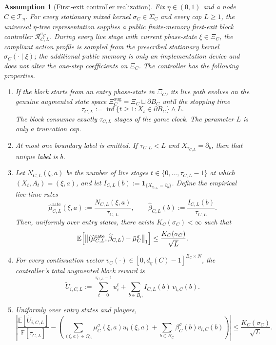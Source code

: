\documentclass[12pt]{article}
\newtheorem{assumption}[theorem]{Assumption}
\theoremstyle{definition}
\newcommand{\E}{\mathbb{E}}
\newcommand{\1}{\mathbf{1}}
\newcommand{\cT}{\mathcal{T}}
\begin{document}
\begin{assumption}[First-exit controller realization]
\label{ass:controller-input}
Fix $\eta\in(0,1)$ and a node $C\in\cT_\eta$. For every stationary mixed kernel
$\sigma_C\in\Sigma_C$ and every cap $L\ge 1$, the universal
$\eta$-tree representation supplies a public finite-memory first-exit block
controller $\mathcal R_{C,L}^{\sigma_C}$. During every live stage with current
phase-state $\xi\in\Xi_C$, the compliant action profile is sampled from the
prescribed stationary kernel $\sigma_C(\cdot\mid\xi)$; the additional public
memory is only an implementation device and does not alter the one-step
coefficients on $\Xi_C$. The controller has the following properties.
\begin{enumerate}[label=\textnormal{(R\arabic*)},leftmargin=2.8em]
\item If the block starts from an entry phase-state in $\Xi_C$, its live path
evolves on the genuine augmented state space
$\Xi_C^{\mathrm{aug}}=\Xi_C\sqcup\partial B_C$ until the stopping time
\[
\tau_{C,L}
:=
\inf\{t\ge 1:X_t\in\partial B_C\}\wedge L.
\]
The block consumes exactly $\tau_{C,L}$ stages of the game clock. The parameter
$L$ is only a truncation cap.
\item At most one boundary label is emitted. If $\tau_{C,L}<L$ and
$X_{\tau_{C,L}}=\partial_b$, then that unique label is $b$.
\item Let $N_{C,L}(\xi,a)$ be the number of live stages
$t\in\{0,\dots,\tau_{C,L}-1\}$ at which $(X_t,A_t)=(\xi,a)$, and let
$I_{C,L}(b):=\1_{\{X_{\tau_{C,L}}=\partial_b\}}$. Define the empirical live-time
rates
\[
\widehat\mu_{C,L}^{\mathrm{rate}}(\xi,a):=\frac{N_{C,L}(\xi,a)}{\tau_{C,L}},
\qquad
\widehat\beta_{C,L}(b):=\frac{I_{C,L}(b)}{\tau_{C,L}}.
\]
Then, uniformly over entry states, there exists $K_C(\sigma_C)<\infty$ such that
\begin{equation}
\label{eq:controller-input-occ}
\E\Bigl[
\bigl\|(\widehat\mu_{C,L}^{\mathrm{rate}},\widehat\beta_{C,L})
-
\bar\mu_C^\sigma
\bigr\|_1
\Bigr]
\le \frac{K_C(\sigma_C)}{\sqrt L}.
\end{equation}
\item For every continuation vector
$v_C(\cdot)\in[0,d_\eta(C)-1]^{B_C\times N}$, the controller's total augmented
block reward is
\[
\widetilde U_{i,C,L}
:=
\sum_{t=0}^{\tau_{C,L}-1} u_i^t
+
\sum_{b\in B_C}I_{C,L}(b)\,v_{i,C}(b).
\]
\item Uniformly over entry states and players,
\begin{equation}
\label{eq:controller-input-renewal}
\left|
\frac{\E[\widetilde U_{i,C,L}]}{\E[\tau_{C,L}]}
-
\left(
\sum_{(\xi,a)\in\Omega_C}\mu_C^\sigma(\xi,a)u_i(\xi,a)
+
\sum_{b\in B_C}\beta_C^\sigma(b)v_{i,C}(b)
\right)
\right|
\le \frac{K_C(\sigma_C)}{\sqrt L}.
\end{equation}
\end{enumerate}
\end{assumption}
\end{document}
